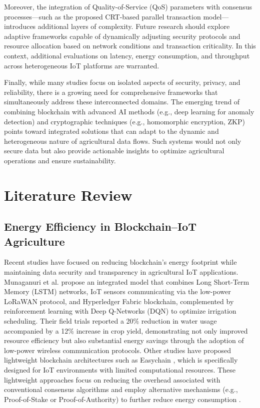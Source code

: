 \documentclass[12pt,onecolumn]{IEEEtran} %
\begin{document}
Moreover, the integration of Quality-of-Service (QoS) parameters with consensus processes—such as the proposed CRT-based parallel transaction model—introduces additional layers of complexity. Future research should explore adaptive frameworks capable of dynamically adjusting security protocols and resource allocation based on network conditions and transaction criticality. In this context, additional evaluations on latency, energy consumption, and throughput across heterogeneous IoT platforms are warranted.

Finally, while many studies focus on isolated aspects of security, privacy, and reliability, there is a growing need for comprehensive frameworks that simultaneously address these interconnected domains. The emerging trend of combining blockchain with advanced AI methods (e.g., deep learning for anomaly detection) and cryptographic techniques (e.g., homomorphic encryption, ZKP) points toward integrated solutions that can adapt to the dynamic and heterogeneous nature of agricultural data flows. Such systems would not only secure data but also provide actionable insights to optimize agricultural operations and ensure sustainability.



\section{Literature Review}

\subsection{Energy Efficiency in Blockchain–IoT Agriculture}
Recent studies have focused on reducing blockchain’s energy footprint while maintaining data security and transparency in agricultural IoT applications. Munaganuri et al. \cite{munaganuri2025designofan} propose an integrated model that combines Long Short-Term Memory (LSTM) networks, IoT sensors communicating via the low-power LoRaWAN protocol, and Hyperledger Fabric blockchain, complemented by reinforcement learning with Deep Q-Networks (DQN) to optimize irrigation scheduling. Their field trials reported a 20\% reduction in water usage accompanied by a 12\% increase in crop yield, demonstrating not only improved resource efficiency but also substantial energy savings through the adoption of low-power wireless communication protocols. Other studies have proposed lightweight blockchain architectures such as Easychain \cite{bapatla2023easychainaniotfriendly}, which is specifically designed for IoT environments with limited computational resources. These lightweight approaches focus on reducing the overhead associated with conventional consensus algorithms and employ alternative mechanisms (e.g., Proof-of-Stake or Proof-of-Authority) to further reduce energy consumption \cite{alkhateeb2022hybridblockchainplatforms, tahayur2024enhancingelectronicagriculture}.
\end{document}
